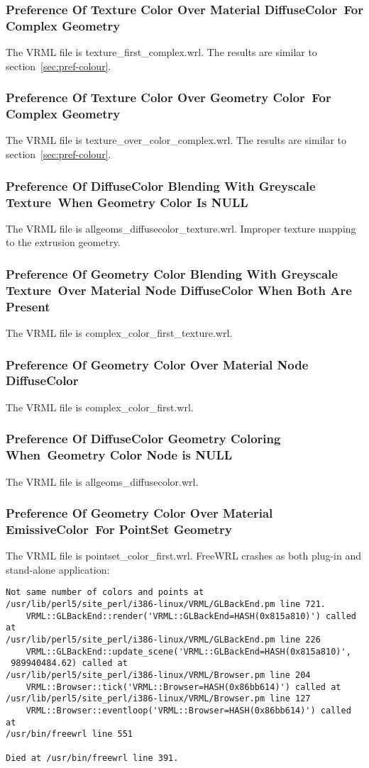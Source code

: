 \documentclass[12pt,letterpaper]{article}
\newcommand{\MatHa}{Preference Of Texture Color Over Material DiffuseColor~}
\newcommand{\MatHb}{For Complex Geometry}
\newcommand{\MatIa}{Preference Of Texture Color Over Geometry Color~}
\newcommand{\MatIb}{For Complex Geometry}
\newcommand{\MatJa}{Preference Of DiffuseColor Blending With Greyscale Texture~}
\newcommand{\MatJb}{When Geometry Color Is NULL}
\newcommand{\MatKa}{Preference Of Geometry Color Blending With Greyscale Texture~}
\newcommand{\MatKb}{Over Material Node DiffuseColor When Both Are Present}
\newcommand{\MatL}{Preference Of Geometry Color Over Material Node DiffuseColor}
\newcommand{\MatMa}{Preference Of DiffuseColor Geometry Coloring When~}
\newcommand{\MatMb}{Geometry Color Node is NULL}
\newcommand{\MatNa}{Preference Of Geometry Color Over Material EmissiveColor~}
\newcommand{\MatNb}{For PointSet Geometry}
\begin{document}
\subsubsection{\MatHa\MatHb}
The VRML file is texture\_first\_complex.wrl.\newline
The results are similar to section~\ref{sec:pref-colour}.

\subsubsection{\MatIa\MatIb}
The VRML file is texture\_over\_color\_complex.wrl.\newline
The results are similar to section~\ref{sec:pref-colour}.

\subsubsection{\MatJa\MatJb}
The VRML file is allgeoms\_diffusecolor\_texture.wrl.\newline
Improper texture mapping to the extrusion geometry.

\subsubsection{\MatKa\MatKb}
The VRML file is complex\_color\_first\_texture.wrl.

\subsubsection{\MatL}
The VRML file is complex\_color\_first.wrl.

\subsubsection{\MatMa\MatMb}
The VRML file is allgeoms\_diffusecolor.wrl.

\subsubsection{\MatNa\MatNb}
The VRML file is pointset\_color\_first.wrl.\newline
FreeWRL crashes as both plug-in and stand-alone application:
\begin{verbatim}
Not same number of colors and points at 
/usr/lib/perl5/site_perl/i386-linux/VRML/GLBackEnd.pm line 721.
    VRML::GLBackEnd::render('VRML::GLBackEnd=HASH(0x815a810)') called at 
/usr/lib/perl5/site_perl/i386-linux/VRML/GLBackEnd.pm line 226
    VRML::GLBackEnd::update_scene('VRML::GLBackEnd=HASH(0x815a810)',
 989940484.62) called at
/usr/lib/perl5/site_perl/i386-linux/VRML/Browser.pm line 204
    VRML::Browser::tick('VRML::Browser=HASH(0x86bb614)') called at 
/usr/lib/perl5/site_perl/i386-linux/VRML/Browser.pm line 127
    VRML::Browser::eventloop('VRML::Browser=HASH(0x86bb614)') called at 
/usr/bin/freewrl line 551

Died at /usr/bin/freewrl line 391.
\end{verbatim}
\end{document}

